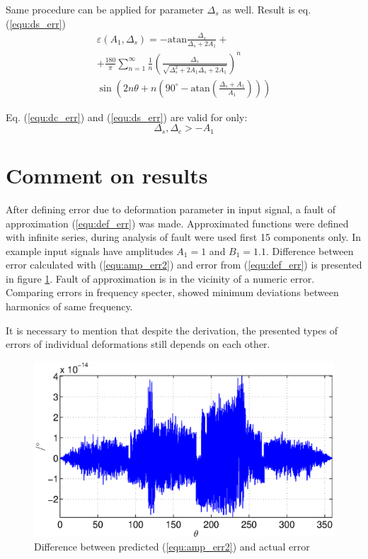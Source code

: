 \documentclass[a4paper]{article}
\begin{document}
Same procedure can be applied for parameter $\Delta_s$ as well. Result is eq.(\ref{equ:ds_err})
\begin{multline}
\label{equ:ds_err}
\varepsilon(A_1, \Delta_s) = -\mathrm{atan}\frac{\Delta_s}{\Delta_s+2 A_1}+\\+\frac{180}{\pi} \sum_{n=1}^{\infty}\frac{1}{n} (\frac{\Delta_s}{\sqrt{\Delta_s^2+2 A_1 \Delta_s+2A_1}})^n\\ \sin (2n \theta+n (90^\circ- \mathrm{ atan}(\frac{\Delta_s+A_1}{A_1})))
\end{multline}

Eq. (\ref{equ:dc_err}) and (\ref{equ:ds_err}) are valid for only: 
\begin{equation*}
\Delta_s, \Delta_c > -A_1
\end{equation*}

\section{Comment on results}
After defining error due to deformation parameter in input signal, a fault of approximation (\ref{equ:def_err}) was made. Approximated functions were defined with infinite series, during analysis of fault were used first 15 components only. In example input signals have amplitudes $A_1 = 1$ and $B_1 = 1.1$. Difference between error calculated with (\ref{equ:amp_err2}) and error from (\ref{equ:def_err})  is presented in figure \ref{fig:razlika}. Fault of approximation is in the vicinity of a numeric error. Comparing errors in frequency specter, showed minimum deviations between harmonics of same frequency.

It is necessary to mention that despite the derivation, the presented types of errors of individual deformations still depends on each other.
\begin{figure}[!htb]
	\begin{center}
		\includegraphics[width=\linewidth]{./Slike/razlika_amp.eps}
		\caption{Difference between predicted (\ref{equ:amp_err2}) and actual error} \label{fig:razlika}
	\end{center}
\end{figure}
\end{document}
